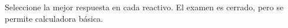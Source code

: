 \documentclass[11pt,addpoints]{exam}
\begin{document}

\begin{examinfo}
Seleccione la mejor respuesta en cada reactivo. El examen es cerrado, pero se permite calculadora básica.
\end{examinfo}

\begin{questions}

\end{questions}
\end{document}
